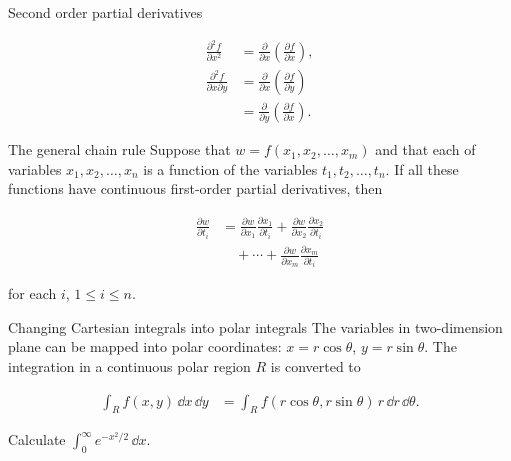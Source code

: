 \begin{concept}{Second order partial derivatives}

\[
  \begin{aligned}
  \frac{\partial^2f}{\partial x^2}&=\frac{\partial}{\partial x}\left(\frac{\partial f}{\partial x}\right),\\
  \frac{\partial^2f}{\partial x\partial y}
  &=\frac{\partial}{\partial x}\left(\frac{\partial f}{\partial y}\right)\\
  &=\frac{\partial}{\partial y}\left(\frac{\partial f}{\partial x}\right).
  \end{aligned}
\]
\end{concept}

\begin{concept}{The general chain rule}
Suppose that $w=f(x_1,x_2,\ldots,x_m)$ and that each of
variables $x_1,x_2,\ldots,x_n$ is a function of the variables $t_1,t_2,\ldots,t_n$. If all these
functions have continuous first-order partial derivatives, then

\[
  \begin{aligned}
  \frac{\partial w}{\partial t_i}
  &=\frac{\partial w}{\partial x_1}\frac{\partial x_1}{\partial t_i}
   +\frac{\partial w}{\partial x_2}\frac{\partial x_2}{\partial t_i}\\
  &\quad+\cdots+
   \frac{\partial w}{\partial x_m}\frac{\partial x_m}{\partial t_i}
  \end{aligned}
\]
\end{concept}

for each $i$, $1\leq i\leq n$.

\begin{concept}{Changing Cartesian integrals into polar integrals}
The variables in two-dimension
plane can be mapped into polar coordinates: $x=r\cos\theta$, $y=r\sin\theta$. The integration
in a continuous polar region $R$ is converted to

\[
  \begin{aligned}
  \int_R f(x,y)\,\dd x\,\dd y
  &=\int_R f(r\cos\theta,r\sin\theta)\,r\,\dd r\,\dd\theta.
  \end{aligned}
\]
\end{concept}

\begin{problem}{Calculate $\displaystyle\int_{0}^{\infty}e^{-x^2/2}\,\dd x$.}
\end{problem}

